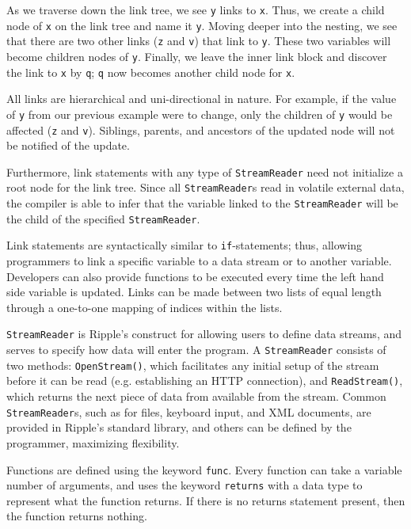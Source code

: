 \documentclass{article}
\newcommand{\code}{\texttt}
\begin{document}
As we traverse down the link tree, we see \code{y} links to \code{x}. Thus, we create a child node of \code{x} on the link tree and name it \code{y}. Moving deeper into the nesting, we see that there are two other links (\code{z} and \code{v}) that link to \code{y}. These two variables will become children nodes of \code{y}. Finally, we leave the inner link block and discover the link to \code{x} by \code{q}; \code{q} now becomes another child node for \code{x}.

All links are hierarchical and uni-directional in nature. For example, if the value of \code{y} from our previous example were to change, only the children of \code{y} would be affected (\code{z} and \code{v}). Siblings, parents, and ancestors of the updated node will not be notified of the update. 

Furthermore, link statements with any type of \code{StreamReader} need not initialize a root node for the link tree. Since all \code{StreamReader}s read in volatile external data, the compiler is able to infer that the variable linked to the \code{StreamReader} will be the child of the specified \code{StreamReader}.

Link statements are syntactically similar to \code{if}-statements; thus, allowing
programmers to link a specific variable to a data stream or to another variable.
Developers can also provide functions to be executed every time the left hand
side variable is updated. Links can be made between two lists of equal length
through a one-to-one mapping of indices within the lists.

\code{StreamReader} is Ripple's construct for allowing users to define data
streams, and serves to specify how data will enter the program. A
\code{StreamReader} consists of two methods: \code{OpenStream()}, which
facilitates any initial setup of the stream before it can be read (e.g.
establishing an HTTP connection), and \code{ReadStream()}, which returns the
next piece of data from available from the stream. Common \code{StreamReader}s,
such as for files, keyboard input, and XML documents, are provided in Ripple's
standard library, and others can be defined by the programmer, maximizing
flexibility.
    
Functions are defined using the keyword \code{func}. Every function can take a variable number of arguments, and uses the keyword \code{returns} with a data type to represent what the function returns. If there is no returns statement present, then the function returns nothing.
\end{document}
